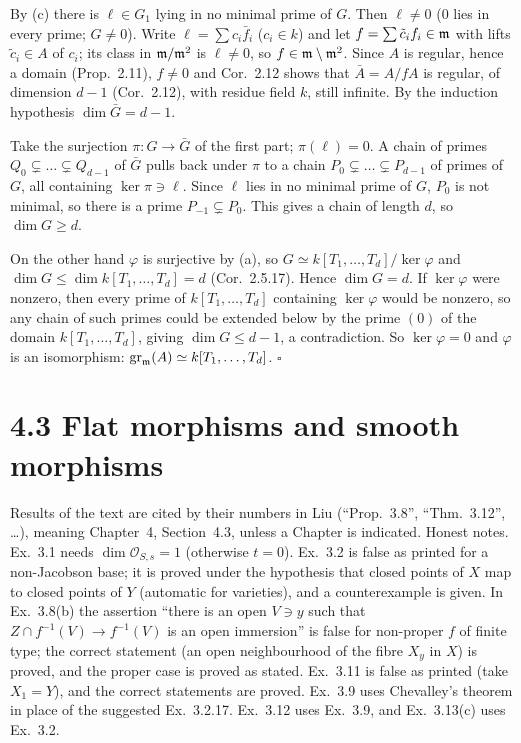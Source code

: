 \documentclass[11pt]{article}
\begin{document}
By (c) there is $\ell\in G_1$ lying in no minimal prime of $G$. Then $\ell\ne0$ ($0$ lies in every prime; $G\ne0$). Write $\ell=\sum c_i\bar f_i$ ($c_i\in k$) and let $f=\sum\tilde c_if_i\in\mathfrak m$ with lifts $\tilde c_i\in A$ of $c_i$; its class in $\mathfrak m/\mathfrak m^2$ is $\ell\ne0$, so $f\in\mathfrak m\setminus\mathfrak m^2$. Since $A$ is regular, hence a domain (Prop.~2.11), $f\ne0$ and Cor.~2.12 shows that $\bar A=A/fA$ is regular, of dimension $d-1$ (Cor.~2.12), with residue field $k$, still infinite. By the induction hypothesis $\dim\bar G=d-1$.

Take the surjection $\pi:G\to\bar G$ of the first part; $\pi(\ell)=0$. A chain of primes $Q_0\subsetneq\dots\subsetneq Q_{d-1}$ of $\bar G$ pulls back under $\pi$ to a chain $P_0\subsetneq\dots\subsetneq P_{d-1}$ of primes of $G$, all containing $\ker\pi\ni\ell$. Since $\ell$ lies in no minimal prime of $G$, $P_0$ is not minimal, so there is a prime $P_{-1}\subsetneq P_0$. This gives a chain of length $d$, so $\dim G\ge d$.

On the other hand $\varphi$ is surjective by (a), so $G\simeq k[T_1,\dots,T_d]/\ker\varphi$ and $\dim G\le\dim k[T_1,\dots,T_d]=d$ (Cor.~2.5.17). Hence $\dim G=d$. If $\ker\varphi$ were nonzero, then every prime of $k[T_1,\dots,T_d]$ containing $\ker\varphi$ would be nonzero, so any chain of such primes could be extended below by the prime $(0)$ of the domain $k[T_1,\dots,T_d]$, giving $\dim G\le d-1$, a contradiction. So $\ker\varphi=0$ and $\varphi$ is an isomorphism: $\operatorname{gr}_\mathfrak m(A)\simeq k[T_1,\dots,T_d]$. \hfill$\square$

\section*{4.3 Flat morphisms and smooth morphisms}

Results of the text are cited by their numbers in Liu (``Prop.~3.8'', ``Thm.~3.12'', \dots), meaning Chapter~4, Section~4.3, unless a Chapter is indicated. Honest notes. Ex.~3.1 needs $\dim\mathcal O_{S,s}=1$ (otherwise $t=0$). Ex.~3.2 is false as printed for a non-Jacobson base; it is proved under the hypothesis that closed points of $X$ map to closed points of $Y$ (automatic for varieties), and a counterexample is given. In Ex.~3.8(b) the assertion ``there is an open $V\ni y$ such that $Z\cap f^{-1}(V)\to f^{-1}(V)$ is an open immersion'' is false for non-proper $f$ of finite type; the correct statement (an open neighbourhood of the fibre $X_y$ in $X$) is proved, and the proper case is proved as stated. Ex.~3.11 is false as printed (take $X_1=Y$), and the correct statements are proved. Ex.~3.9 uses Chevalley's theorem in place of the suggested Ex.~3.2.17. Ex.~3.12 uses Ex.~3.9, and Ex.~3.13(c) uses Ex.~3.2.
\end{document}
